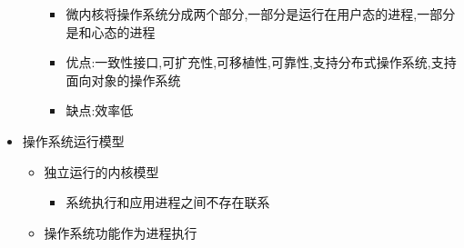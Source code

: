 \documentclass[a4paper,10pt,notitlepage]{article}
\begin{document}
\begin{itemize}
\begin{itemize}
\begin{itemize}
			\item 微内核将操作系统分成两个部分,一部分是运行在用户态的进程,一部分是和心态的进程
			\item 优点:一致性接口,可扩充性,可移植性,可靠性,支持分布式操作系统,支持面向对象的操作系统
			\item 缺点:效率低
		\end{itemize}
	\end{itemize}
	\item 操作系统运行模型
		\begin{itemize}
			\item 独立运行的内核模型
			\begin{itemize}
				\item 系统执行和应用进程之间不存在联系
			\end{itemize}
			\item 操作系统功能作为进程执行
		\end{itemize}
\end{itemize}
\end{document}
